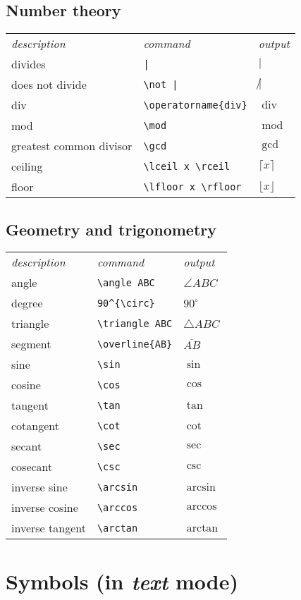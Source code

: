 \begin{multicols}{3}
\subsection{Number theory}
\begin{tabular}{lll}
\emph{description} & \emph{command} & \emph{output}\\
divides & \verb!|! & $|$\\
does not divide & \verb!\not |! & $\not |$\\
div & \verb!\operatorname{div}! & $\operatorname{div}$\\
mod & \verb!\mod! & $\operatorname{mod}$\\
greatest common divisor & \verb!\gcd! & $\gcd$\\
ceiling & \verb!\lceil x \rceil! & $\lceil x\rceil$\\
floor & \verb!\lfloor x \rfloor! & $\lfloor x \rfloor$\\
\end{tabular}




\subsection{Geometry and trigonometry}
\begin{tabular}{lll}
\emph{description} & \emph{command} & \emph{output}\\
angle& \verb!\angle ABC! & $\angle ABC$\\
degree& \verb!90^{\circ}! & $90^{\circ}$\\
triangle& \verb!\triangle ABC! & $\triangle ABC$\\
segment& \verb!\overline{AB}! & $\overline{AB}$\\
sine& \verb!\sin! & $\sin$\\
cosine& \verb!\cos! & $\cos$\\
tangent& \verb!\tan! & $\tan$\\
cotangent& \verb!\cot! & $\cot$\\
secant& \verb!\sec! & $\sec$\\
cosecant& \verb!\csc! & $\csc$\\
inverse sine& \verb!\arcsin! & $\arcsin$\\
inverse cosine& \verb!\arccos! & $\arccos$\\
inverse tangent& \verb!\arctan! & $\arctan$\\
\end{tabular}

\section{Symbols (in \emph{text} mode)}


\end{multicols}
